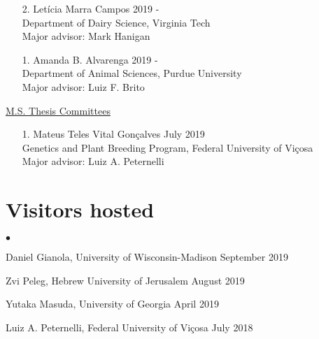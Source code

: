 \documentclass[margin,line,10pt]{res}
\newenvironment{list2}{
  \begin{list}{$\bullet$}{%
      \setlength{\itemsep}{0in}
      \setlength{\parsep}{0in} \setlength{\parskip}{0in}
      \setlength{\topsep}{0in} \setlength{\partopsep}{0in} 
      \setlength{\leftmargin}{0.2in}}}{\end{list}}
\begin{document}
\begin{resume}
\begin{enumerate}
  \vspace{0.3cm}

  \item [2.] Let\'{i}cia Marra Campos  \hfill 2019 - \\
  Department of Dairy Science,  Virginia Tech \\ 
  Major advisor: Mark Hanigan

  \vspace{0.3cm}

\item [1.] Amanda B. Alvarenga   \hfill 2019 - \\
  Department of Animal Sciences, Purdue University \\
  Major advisor: Luiz F. Brito
\end{enumerate}


\begin{flushleft}
\hspace{0.2cm} \underline{M.S. Thesis Committees}
\end{flushleft}
\begin{enumerate}
\item [1.] Mateus Teles Vital Gon\c calves  \hfill July 2019 \\
  Genetics and Plant Breeding Program, Federal University of  Vi\c cosa\\
  Major advisor: Luiz A. Peternelli
\end{enumerate}


\vspace{0.5cm}
\section{\sc Visitors hosted}

\begin{list2}
\item Daniel Gianola, University of Wisconsin-Madison  \hfill September 2019\\

\item Zvi Peleg, Hebrew University of Jerusalem   \hfill August 2019\\

\item Yutaka Masuda, University of Georgia \hfill April 2019\\

\item Luiz A. Peternelli, Federal University of Vi\c cosa  \hfill July 2018\\


\end{list2}
\end{resume}
\end{document}
